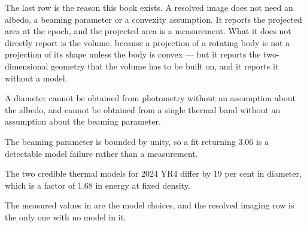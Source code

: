 The last row is the reason this book exists. A resolved image does not need
an albedo, a beaming parameter or a convexity assumption. It reports the
projected area at the epoch, and the projected area is a measurement. What it
does not directly report is the volume, because a projection of a rotating
body is not a projection of its shape unless the body is convex --- but it
reports the two-dimensional geometry that the volume has to be built on, and
it reports it without a model.

\begin{keytakeaways}
\item A diameter cannot be obtained from photometry without an assumption
about the albedo, and cannot be obtained from a single thermal band without
an assumption about the beaming parameter.
\item The beaming parameter is bounded by unity, so a fit returning 3.06 is a
detectable model failure rather than a measurement.
\item The two credible thermal models for 2024 YR4 differ by 19 per cent in
diameter, which is a factor of 1.68 in energy at fixed density.
\item The measured values in  are the model choices, and
the resolved imaging row is the only one with no model in it.
\end{keytakeaways}
